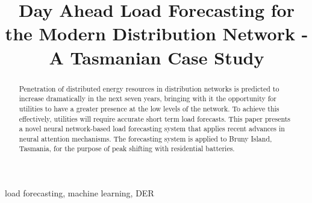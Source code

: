 \documentclass[conference]{IEEEtran}
\begin{document}
\title{Day Ahead Load Forecasting for the Modern Distribution Network - A Tasmanian Case Study}

\author{
\and
{}
\and
{}
\and
{}
}

\maketitle

\begin{abstract}
Penetration of distributed energy resources in distribution networks is predicted to increase dramatically in the next seven years, bringing with it the opportunity for utilities to have a greater presence at the low levels of the network.
To achieve this effectively, utilities will require accurate short term load forecasts.
This paper presents a novel neural network-based load forecasting system that applies recent advances in neural attention mechanisms.
The forecasting system is applied to Bruny Island, Tasmania, for the purpose of peak shifting with residential batteries.
\end{abstract}

\begin{IEEEkeywords}
load forecasting, machine learning, DER
\end{IEEEkeywords}
\end{document}
